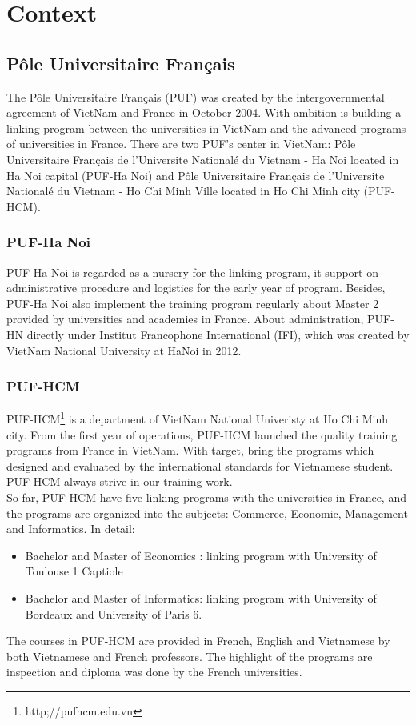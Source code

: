 \chapter{Context}
\section{P\^{o}le Universitaire Fran\c{c}ais}

The P\^{o}le Universitaire Fran\c{c}ais (PUF) was created by the intergovernmental agreement of VietNam and France in October 2004. With ambition is building a linking program between the universities in VietNam and the advanced programs of universities in France. There are two PUF's center in VietNam: P\^{o}le Universitaire Fran\c{c}ais de l'Universite National\'{e} du Vietnam - Ha Noi located in Ha Noi capital (PUF-Ha Noi) and P\^{o}le Universitaire Fran\c{c}ais de l'Universite National\'{e} du Vietnam - Ho Chi Minh Ville located in Ho Chi Minh city (PUF-HCM).
\subsection{PUF-Ha Noi}

PUF-Ha Noi is regarded as a nursery for the linking program, it support on administrative procedure and logistics for the early year of program. Besides, PUF-Ha Noi also implement the training program regularly about Master 2 provided by universities and academies in France. About administration, PUF-HN directly under Institut Francophone International (IFI), which was created by VietNam National University at HaNoi in 2012.
\subsection{PUF-HCM}

PUF-HCM\footnote{http;//pufhcm.edu.vn} is a department of VietNam National Univeristy at Ho Chi Minh city. From the first year of operations, PUF-HCM launched the quality training programs from France in VietNam. With target, bring the programs which designed and evaluated by the international standards for Vietnamese student. PUF-HCM always strive in our training work.\\
So far, PUF-HCM have five linking programs with the universities in France, and the programs are organized into the subjects: Commerce, Economic, Management and Informatics. In detail:
\begin{itemize}
\item Bachelor and Master of Economics : linking program with University of Toulouse 1 Captiole
\item Bachelor and Master of Informatics: linking program with University of Bordeaux and University of Paris 6.
\end{itemize}
The courses in PUF-HCM are provided in French, English and Vietnamese by both Vietnamese and French professors. The highlight of the programs are inspection and diploma was done by the French universities.
